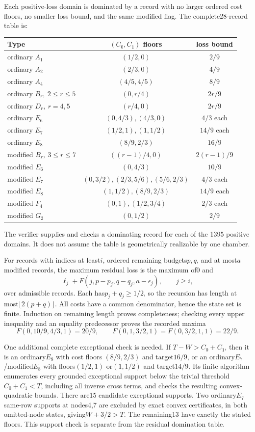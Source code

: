 \documentclass[11pt]{article}
\theoremstyle{remark}\newtheorem{remark}[theorem]{Remark}
\begin{document}
Each positive-loss domain is dominated by a record with no larger
ordered cost floors, no smaller loss bound, and the same modified
flag. The complete28-record table is:
\begin{center}\small
\begin{tabular}{lcc}
\toprule Type&$(C_0,C_1)$ floors&loss bound\\\midrule
ordinary $A_1$&$(1/2,0)$&$2/9$\\
ordinary $A_2$&$(2/3,0)$&$4/9$\\
ordinary $A_4$&$(4/5,4/5)$&$8/9$\\
ordinary $B_r,\ 2\le r\le5$&$(0,r/4)$&$2r/9$\\
ordinary $D_r,\ r=4,5$&$(r/4,0)$&$2r/9$\\
ordinary $E_6$&$(0,4/3),(4/3,0)$&$4/3$ each\\
ordinary $E_7$&$(1/2,1),(1,1/2)$&$14/9$ each\\
ordinary $E_8$&$(8/9,2/3)$&$16/9$\\
modified $B_r,\ 3\le r\le7$&$((r-1)/4,0)$&$2(r-1)/9$\\
modified $E_6$&$(0,4/3)$&$10/9$\\
modified $E_7$&$(0,3/2),(2/3,5/6),(5/6,2/3)$&$4/3$ each\\
modified $E_8$&$(1,1/2),(8/9,2/3)$&$14/9$ each\\
modified $F_4$&$(0,1),(1/2,3/4)$&$2/3$ each\\
modified $G_2$&$(0,1/2)$&$2/9$\\\bottomrule
\end{tabular}
\end{center}
The verifier supplies and checks a dominating record for each of the
1395 positive domains. It does not assume the table is geometrically
realizable by one chamber.

For records with indices at least$i$, ordered remaining budgets$p,q$,
and at most$a$ modified records, the maximum residual loss is
the maximum of0 and
\[
 \ell_j+F(j,p-p_j,q-q_j,a-\epsilon_j),\qquad j\ge i,
\]
over admissible records. Each has$p_j+q_j\ge1/2$, so the recursion
has length at most$\lfloor2(p+q)\rfloor$. All costs have a common
denominator, hence the state set is finite. Induction on remaining
length proves completeness; checking every upper inequality and an
equality predecessor proves the recorded maxima
\[
 F(0,10/9,4/3,1)=20/9,\qquad
 F(0,1,3/2,1)=F(0,3/2,1,1)=22/9.
\]

One additional complete exceptional check is needed. If
$T-W>C_0+C_1$, then it is an ordinary$E_8$ with cost floors
$(8/9,2/3)$ and target$16/9$, or an ordinary$E_7$/modified$E_8$
with floors$(1/2,1)$ or$(1,1/2)$ and target$14/9$.
Its finite algorithm enumerates every grounded exceptional support
below the trivial threshold$C_0+C_1<T$, including all inverse
cross terms, and checks the resulting convex-quadratic bounds.
There are15 candidate exceptional supports. Two ordinary$E_7$
same-row supports at nodes4,7 are excluded by exact convex
certificates, in both omitted-node states, giving$W+3/2>T$.
The remaining13 have exactly the stated floors. This support
check is separate from the residual domination table.
\end{document}
